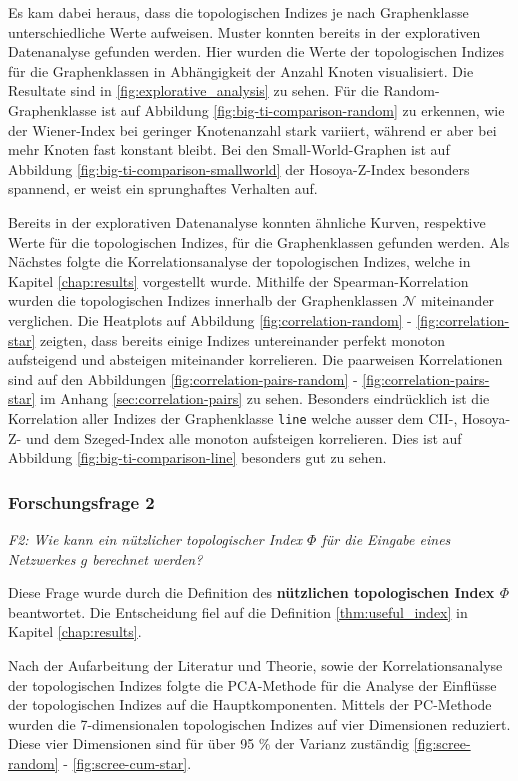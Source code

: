 Es kam dabei heraus, dass die topologischen Indizes je nach Graphenklasse unterschiedliche Werte aufweisen. Muster konnten bereits in der explorativen Datenanalyse gefunden werden. Hier wurden die Werte der topologischen Indizes für die Graphenklassen in Abhängigkeit der Anzahl Knoten visualisiert. Die Resultate sind in \ref{fig:explorative_analysis} zu sehen.
Für die Random-Graphenklasse ist auf Abbildung \ref{fig:big-ti-comparison-random} zu erkennen, wie der Wiener-Index bei geringer Knotenanzahl stark variiert, während er aber bei mehr Knoten fast konstant bleibt.
Bei den Small-World-Graphen ist auf Abbildung \ref{fig:big-ti-comparison-smallworld} der Hosoya-Z-Index besonders spannend, er weist ein sprunghaftes Verhalten auf.

Bereits in der explorativen Datenanalyse konnten ähnliche Kurven, respektive Werte für die topologischen Indizes, für die Graphenklassen gefunden werden.
Als Nächstes folgte die Korrelationsanalyse der topologischen Indizes, welche in Kapitel \ref{chap:results} vorgestellt wurde. Mithilfe der Spearman-Korrelation wurden die topologischen Indizes innerhalb der Graphenklassen $ \mathcal{N} $ miteinander verglichen. Die Heatplots auf Abbildung \ref{fig:correlation-random} - \ref{fig:correlation-star} zeigten, dass bereits einige Indizes untereinander perfekt monoton aufsteigend und absteigen miteinander korrelieren.
Die paarweisen Korrelationen sind auf den Abbildungen \ref{fig:correlation-pairs-random} - \ref{fig:correlation-pairs-star} im Anhang \ref{sec:correlation-pairs} zu sehen.
Besonders eindrücklich ist die Korrelation aller Indizes der Graphenklasse \texttt{line} welche ausser dem CII-, Hosoya-Z- und dem Szeged-Index alle monoton aufsteigen korrelieren. Dies ist auf Abbildung \ref{fig:big-ti-comparison-line} besonders gut zu sehen.

\subsubsection{Forschungsfrage 2}

\textit{F2: Wie kann ein nützlicher topologischer Index $\Phi$ für die Eingabe eines Netzwerkes $g$ berechnet werden?}

Diese Frage wurde durch die Definition des \textbf{nützlichen topologischen Index $\Phi$} beantwortet.
Die Entscheidung fiel auf die Definition \ref{thm:useful_index} in Kapitel \ref{chap:results}.

Nach der Aufarbeitung der Literatur und Theorie, sowie der Korrelationsanalyse der topologischen Indizes folgte die PCA-Methode für die Analyse der Einflüsse der topologischen Indizes auf die Hauptkomponenten.
Mittels der PC-Methode wurden die 7-dimensionalen topologischen Indizes auf vier Dimensionen reduziert.
Diese vier Dimensionen sind für über 95 \% der Varianz zuständig \ref{fig:scree-random} - \ref{fig:scree-cum-star}.

